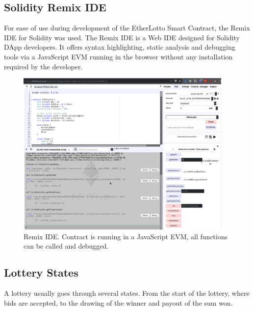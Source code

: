 \subsection{Solidity Remix \ac{IDE}}\label{sec:ide}

For ease of use during development of the EtherLotto Smart Contract, the Remix \ac{IDE} for Solidity was used. The Remix \ac{IDE} is a Web \ac{IDE} designed for Solidity \ac{DApp} developers. It offers syntax highlighting, static analysis and debugging tools via a JavaScript \ac{EVM} running in the browser without any installation required by the developer.

\begin{figure}[h]
  \centering
  \includegraphics[keepaspectratio,width=0.95\textwidth]{images/remix}
  \caption[Remix IDE]{Remix IDE. Contract is running in a JavaScript \ac{EVM}, all functions can be called and debugged.}
  \label{fig:remix}
\end{figure}


\subsection{Lottery States}\label{sec:states}

A lottery usually goes through several states. From the start of the lottery, where bids are accepted, to the drawing of the winner and payout of the sum won.


